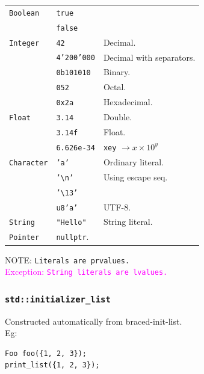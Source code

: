 \begin{tabularx}{\linewidth}{llX}
    \texttt{Boolean}    & \texttt{true}                  & \\
                        & \texttt{false}                 & \\
    \texttt{Integer}    & \texttt{42}                    & Decimal. \\ 
                        & \texttt{4'200'000}             & Decimal with separators.\\
                        & \texttt{0b101010}              & Binary.\\
                        & \texttt{052}                   & Octal.\\
                        & \texttt{0x2a}                  & Hexadecimal.\\ 
    \texttt{Float}      & \texttt{3.14}                  & Double.\\
                        & \texttt{3.14f}                 & Float.\\ 
                        & \texttt{6.626e-34}             & \texttt{xey} $\to x\times 10^y$\\
    \texttt{Character}  & \texttt{'a'}                   & Ordinary literal.\\
                        & \texttt{'\textbackslash n'}    & Using escape seq.\\
                        & \texttt{'\textbackslash 13'}   & \\
                        & \texttt{u8'a'}                 & UTF-8.\\
    \texttt{String}     & \texttt{"Hello"}               & String literal.\\ 
    \texttt{Pointer}    & \texttt{nullptr}.              & \\   
\end{tabularx}
NOTE: \texttt{Literals are prvalues.}\\
\textcolor{magenta}{Exception: \texttt{String literals are lvalues.}}\\

\subsubsection{\texttt{std::initializer\_list}}
Constructed automatically from braced-init-list.\\
Eg:
\begin{mdframed}[nobreak=true,backgroundcolor=gray!10,linecolor=Firebrick4]
\begin{verbatim}
Foo foo({1, 2, 3});
print_list({1, 2, 3});
\end{verbatim}
\end{mdframed}

